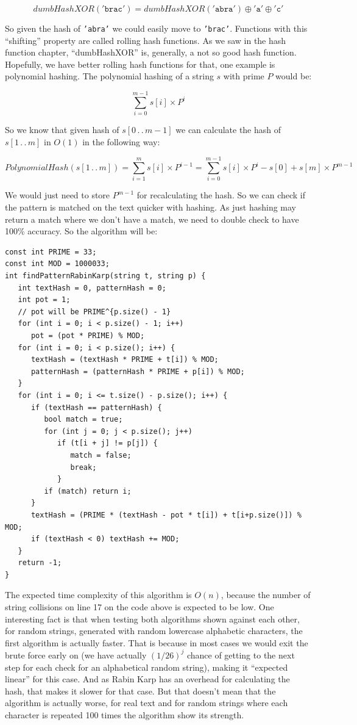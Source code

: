\[ dumbHashXOR(\mathtt{'brac'}) = dumbHashXOR(\mathtt{'abra'}) \oplus \mathtt{'a'} \oplus \mathtt{'c'} \]

So given the hash of \texttt{'abra'} we could easily move to \texttt{'brac'}. Functions with this ``shifting'' property are called rolling hash functions. As we saw in the hash function chapter, ``dumbHashXOR'' is, generally, a not so good hash function. Hopefully, we have better rolling hash functions for that, one example is polynomial hashing. The polynomial hashing of a string \( s \) with prime \( P \) would be:

\[ \sum_{i=0}^{m-1}s[i] \times P^{i} \]

So we know that given hash of \( s[0\,.\,.\,m{-}1] \) we can calculate the hash of \( s[1\,.\,.\,m] \) in \( O(1) \) in the following way:

\[ PolynomialHash(s[1\,.\,.\,m]) = \sum_{i=1}^{m}s[i] \times P^{i-1} = \sum_{i=0}^{m-1}s[i] \times P^{i} - s[0] + s[m] \times P^{m-1} \]

We would just need to store \( P^{m-1} \) for recalculating the hash. So we can check if the pattern is matched on the text quicker with hashing. As just hashing may return a match where we don't have a match, we need to double check to have 100\% accuracy. So the algorithm will be:

\newpage

\begin{lstlisting}
const int PRIME = 33;
const int MOD = 1000033;
int findPatternRabinKarp(string t, string p) {
   int textHash = 0, patternHash = 0;
   int pot = 1;
   // pot will be PRIME^{p.size() - 1}
   for (int i = 0; i < p.size() - 1; i++)
      pot = (pot * PRIME) % MOD;
   for (int i = 0; i < p.size(); i++) {
      textHash = (textHash * PRIME + t[i]) % MOD;
      patternHash = (patternHash * PRIME + p[i]) % MOD;
   }
   for (int i = 0; i <= t.size() - p.size(); i++) {
      if (textHash == patternHash) {
         bool match = true;
         for (int j = 0; j < p.size(); j++)
            if (t[i + j] != p[j]) {
               match = false;
               break;
            }
         if (match) return i;
      }
      textHash = (PRIME * (textHash - pot * t[i]) + t[i+p.size()]) % MOD;
      if (textHash < 0) textHash += MOD;
   }
   return -1;
}
\end{lstlisting}

The expected time complexity of this algorithm is \( O(n) \), because the number of string collisions on line 17 on the code above is expected to be low. One interesting fact is that when testing both algorithms shown against each other, for random strings, generated with random lowercase alphabetic characters, the first algorithm is actually faster. That is because in most cases we would exit the brute force early on (we have actually \( (1/26)^j \) chance of getting to the next step for each check for an alphabetical random string), making it ``expected linear'' for this case. And as Rabin Karp has an overhead for calculating the hash, that makes it slower for that case. But that doesn't mean that the algorithm is actually worse, for real text and for random strings where each character is repeated 100 times the algorithm show its strength.

